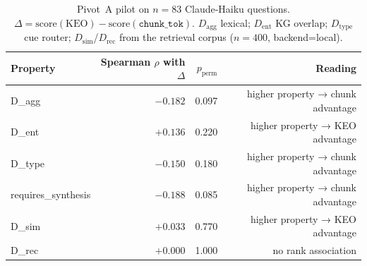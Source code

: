 \begin{table}[t]
\centering
\small
\begin{tabular}{lrrr}
\toprule
Property & Spearman $\rho$ with $\Delta$ & $p_{\mathrm{perm}}$ & Reading \\
\midrule
D\_agg & $-0.182$ & 0.097 & higher property → chunk advantage \\
D\_ent & $+0.136$ & 0.220 & higher property → KEO advantage \\
D\_type & $-0.150$ & 0.180 & higher property → chunk advantage \\
requires\_synthesis & $-0.188$ & 0.085 & higher property → chunk advantage \\
D\_sim & $+0.033$ & 0.770 & higher property → KEO advantage \\
D\_rec & $+0.000$ & 1.000 & no rank association \\
\bottomrule
\end{tabular}
\caption{Pivot~A pilot on $n=83$ Claude-Haiku questions. $\Delta = \mathrm{score}(\mathrm{KEO}) - \mathrm{score}(\texttt{chunk\_tok})$. $D_{\mathrm{agg}}$ lexical; $D_{\mathrm{ent}}$ KG overlap; $D_{\mathrm{type}}$ cue router; $D_{\mathrm{sim}}$/$D_{\mathrm{rec}}$ from the retrieval corpus ($n=400$, backend=local).}
\label{tab:dispersion-pilot}
\end{table}
